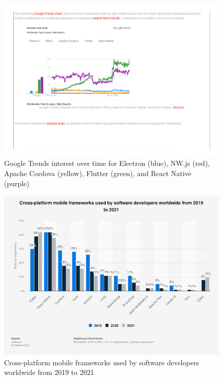 \documentclass[sigconf]{acmart}
\begin{document}
\begin{figure}[H]
    \centering
    \includegraphics[clip, trim=3.5cm 8.2cm 12cm 4.5cm, width=\columnwidth]{./googletrends.pdf}
    \caption{Google Trends interest over time for Electron (blue), NW.js (red), Apache Cordova (yellow), Flutter (green), and React Native (purple)}
    \label{fig:googletrends}
\end{figure}

\begin{figure}[H]
    \centering
    \includegraphics[width=\columnwidth]{statista.png}
    \caption{Cross-platform mobile frameworks used by software developers worldwide from 2019 to 2021}
    \label{fig:statista}
\end{figure}
\end{document}
